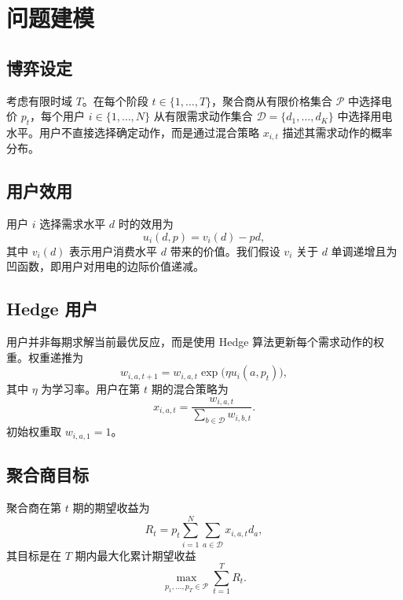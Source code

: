 \documentclass[UTF8]{ctexart}
\begin{document}
\section{问题建模}

\subsection{博弈设定}

考虑有限时域 $T$。在每个阶段 $t \in \{1,\dots,T\}$，聚合商从有限价格集合 $\mathcal{P}$ 中选择电价 $p_t$，每个用户 $i \in \{1,\dots,N\}$ 从有限需求动作集合 $\mathcal{D} = \{d_1,\dots,d_K\}$ 中选择用电水平。用户不直接选择确定动作，而是通过混合策略 $x_{i,t}$ 描述其需求动作的概率分布。

\subsection{用户效用}

用户 $i$ 选择需求水平 $d$ 时的效用为
\begin{equation}
    u_i(d, p) = v_i(d) - p d,
\end{equation}
其中 $v_i(d)$ 表示用户消费水平 $d$ 带来的价值。我们假设 $v_i$ 关于 $d$ 单调递增且为凹函数，即用户对用电的边际价值递减。

\subsection{Hedge 用户}

用户并非每期求解当前最优反应，而是使用 Hedge 算法更新每个需求动作的权重。权重递推为
\begin{equation}
    w_{i,a,t+1} = w_{i,a,t} \exp\bigl(\eta u_i(a, p_t)\bigr),
\end{equation}
其中 $\eta$ 为学习率。用户在第 $t$ 期的混合策略为
\begin{equation}
    x_{i,a,t} = \frac{w_{i,a,t}}{\sum_{b \in \mathcal{D}} w_{i,b,t}}.
\end{equation}
初始权重取 $w_{i,a,1} = 1$。

\subsection{聚合商目标}

聚合商在第 $t$ 期的期望收益为
\begin{equation}
    R_t = p_t \sum_{i=1}^{N} \sum_{a \in \mathcal{D}} x_{i,a,t} d_a,
\end{equation}
其目标是在 $T$ 期内最大化累计期望收益
\begin{equation}
    \max_{p_1,\dots,p_T \in \mathcal{P}} \sum_{t=1}^{T} R_t.
\end{equation}
\end{document}
